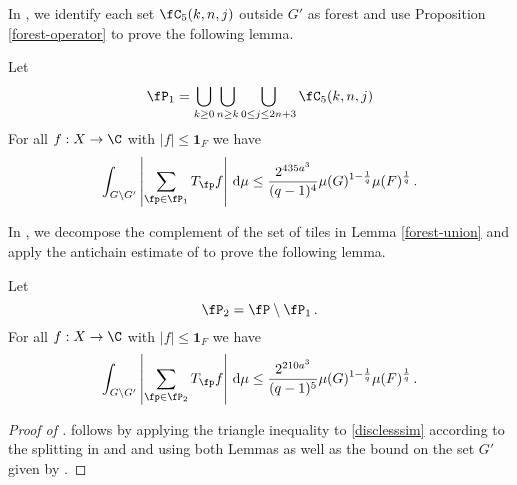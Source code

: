 In , we identify each set $\fC_5(k,n,j)$ outside $G'$ as forest and use Proposition
\ref{forest-operator} to prove the following lemma.

\begin{lemma}
    \label{forest-union}
    \leanok
    Let
    \begin{equation}
        \fP_1 =\bigcup_{k\ge 0}\bigcup_{n\ge k}
        \bigcup_{0\le j\le 2n+3}\fC_5(k,n,j)
    \end{equation}
    For all $f:X\to \C$ with $|f|\le \mathbf{1}_F$ we have
    \begin{equation}
        \label{disclesssim1}
        \int_{G \setminus G'} \left|\sum_{\fp \in \fP_1} T_{\fp} f \right|\, \mathrm{d}\mu \le \frac{2^{435a^3}}{(q-1)^4} \mu(G)^{1 - \frac{1}{q}} \mu(F)^{\frac{1}{q}}\,.
    \end{equation}
\end{lemma}

In , we decompose
the complement of the set of tiles in Lemma
\ref{forest-union} and apply the antichain estimate of
 to prove the following lemma.

\begin{lemma}
    \label{forest-complement}
    \leanok
    Let
    \begin{equation}
        \fP_2 =\fP\setminus \fP_1\,.
    \end{equation}
    For all $f:X\to \C$ with $|f|\le \mathbf{1}_F$ we have
    \begin{equation}
        \label{disclesssim2}
        \int_{G \setminus G'} \left|\sum_{\fp \in \fP_2} T_{\fp} f\right| \, \mathrm{d}\mu \le \frac{2^{210a^3}}{(q-1)^5} \mu(G)^{1 - \frac{1}{q}} \mu(F)^{\frac{1}{q}}\,.
    \end{equation}
\end{lemma}

\begin{proof}[Proof of ]
 follows by applying the
triangle inequality to \eqref{disclesssim}
according to the splitting in 
and  and using both Lemmas as well
as the bound on the set $G'$ given by .
\end{proof}

